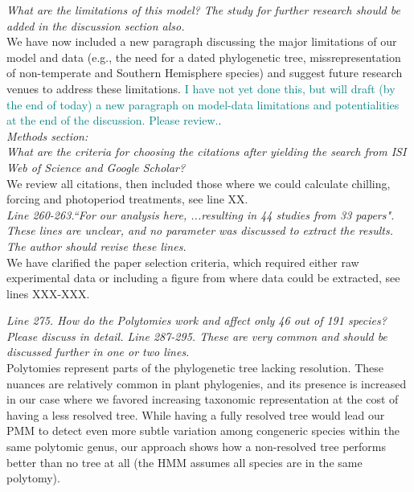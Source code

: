 \documentclass[11pt]{article}
\begin{document}
\emph{What are the limitations of this model? The study for further research should be added in the discussion section also.}\\
We have now included a new paragraph discussing the major limitations of our model and data (e.g., the need for a dated phylogenetic tree, missrepresentation of non-temperate and Southern Hemisphere species) and suggest future research venues to address these limitations.
\textcolor{teal}{I have not yet done this, but will draft (by the end of today) a new paragraph on model-data limitations and potentialities at the end of the discussion. Please review.}.\\

\emph{Methods section:}\\
\emph{What are the criteria for choosing the citations after yielding the search from ISI Web of Science and Google Scholar?}\\
We review all citations, then included those where we could calculate chilling, forcing and photoperiod treatments, see line XX. \\

\emph{Line 260-263.``For our analysis here, ...resulting in 44 studies from 33 papers". These lines are unclear, and no parameter was discussed to extract the results. The author should revise these lines.}\\
We have clarified the paper selection criteria, which required either raw experimental data or including a figure from where data could be extracted, see lines XXX-XXX. 

\emph{Line 275. How do the Polytomies work and affect only 46 out of 191 species? Please discuss in detail. Line 287-295. These are very common and should be discussed further in one or two lines.}\\
Polytomies represent parts of the phylogenetic tree lacking resolution. These nuances are relatively common in plant phylogenies, and its presence is increased in our case where we favored increasing taxonomic representation at the cost of having a less resolved tree. While having a fully resolved tree would lead our PMM to detect even more subtle variation among congeneric species within the same polytomic genus, our approach shows how a non-resolved tree performs better than no tree at all (the HMM assumes all species are in the same polytomy). 
\end{document}
